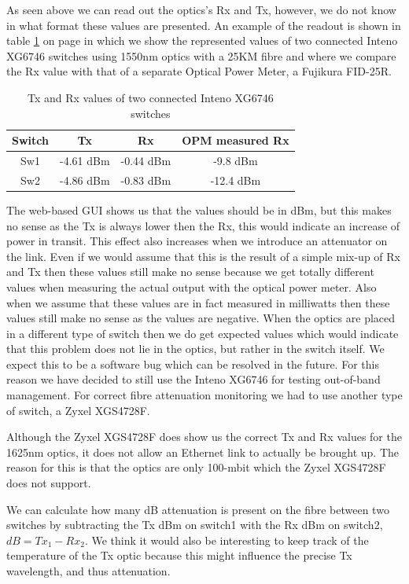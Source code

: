 \documentclass{article}
\begin{document}
As seen above we can read out the optics’s Rx and Tx, however, we do not know in what format these values are presented. An example of the readout is shown in table \ref{tab:crazy-inteno} on page \pageref{tab:crazy-inteno} in which we show the represented values of two connected Inteno XG6746 switches using 1550nm optics with a 25KM fibre and where we compare the Rx value with that of a separate Optical Power Meter, a Fujikura FID-25R.

\begin{table}[h]
\centering
\begin{tabular}{|c|c|c|c|}
\hline 
\textbf{Switch} & \textbf{Tx} & \textbf{Rx} & \textbf{OPM measured Rx}\\ 
\hline 
Sw1 & -4.61 dBm & -0.44 dBm & -9.8 dBm\\ 
\hline 
Sw2 & -4.86 dBm & -0.83 dBm  & -12.4 dBm \\ 
\hline 
\end{tabular} 
\caption{Tx and Rx values of two connected Inteno XG6746 switches}
\label{tab:crazy-inteno}
\end{table}

The web-based GUI shows us that the values should be in dBm, but this makes no sense as the Tx is always lower then the Rx, this would indicate an increase of power in transit. This effect also increases when we introduce an attenuator on the link. Even if we would assume that this is the result of a simple mix-up of Rx and Tx then these values still make no sense because we get totally different values when measuring the actual output with the optical power meter. Also when we assume that these values are in fact measured in milliwatts then these values still make no sense as the values are negative. When the optics are placed in a different type of switch then we do get expected values which would indicate that this problem does not lie in the optics, but rather in the switch itself. We expect this to be a software bug which can be resolved in the future. For this reason we have decided to still use the Inteno XG6746 for testing out-of-band management. For correct fibre attenuation monitoring we had to use another type of switch, a Zyxel XGS4728F.

Although the Zyxel XGS4728F does show us the correct Tx and Rx values for the 1625nm optics, it does not allow an Ethernet link to actually be brought up. The reason for this is that the optics are only 100-mbit which the Zyxel XGS4728F does not support. 

We can calculate how many dB attenuation is present on the fibre between two switches by subtracting the Tx dBm on switch1 with the Rx dBm on switch2, $dB=Tx_1-Rx_2$. We think it would also be interesting to keep track of the temperature of the Tx optic because this might influence the precise Tx wavelength, and thus attenuation.
\end{document}
